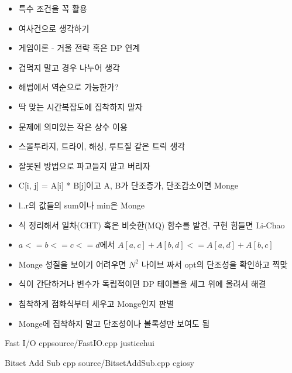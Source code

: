 \documentclass[landscape, 10pt, a4paper, oneside, twocolumn]{extarticle}
\begin{document}
\begin{itemize}
    \item 특수 조건을 꼭 활용
    \item 여사건으로 생각하기
    \item 게임이론 - 거울 전략 혹은 DP 연계
    \item 겁먹지 말고 경우 나누어 생각
    \item 해법에서 역순으로 가능한가?
    \item 딱 맞는 시간복잡도에 집착하지 말자
    \item 문제에 의미있는 작은 상수 이용
    \item 스몰투라지, 트라이, 해싱, 루트질 같은 트릭 생각
    \item 잘못된 방법으로 파고들지 말고 버리자
\end{itemize}

\begin{itemize}
    \item C[i, j] = A[i] * B[j]이고 A, B가 단조증가, 단조감소이면 Monge
    \item l..r의 값들의 sum이나 min은 Monge

    \item 식 정리해서 일차(CHT) 혹은 비슷한(MQ) 함수를 발견, 구현 힘들면 Li-Chao
    \item $a <= b <= c <= d$에서 $A[a,c] + A[b,d] <= A[a,d] + A[b,c]$
    \item Monge 성질을 보이기 어려우면 $N^2$ 나이브 짜서 opt의 단조성을 확인하고 찍맞
    \item 식이 간단하거나 변수가 독립적이면 DP 테이블을 세그 위에 올려서 해결
    \item 침착하게 점화식부터 세우고 Monge인지 판별
    \item Monge에 집착하지 말고 단조성이나 볼록성만 보여도 됨
\end{itemize}

\Algorithm
{Fast I/O}
{}
{}
{cpp}{source/FastIO.cpp}
{justicehui}

\Algorithm
{Bitset Add Sub}
{}
{}
{cpp}
{source/BitsetAddSub.cpp}
{cgiosy}
\end{document}
